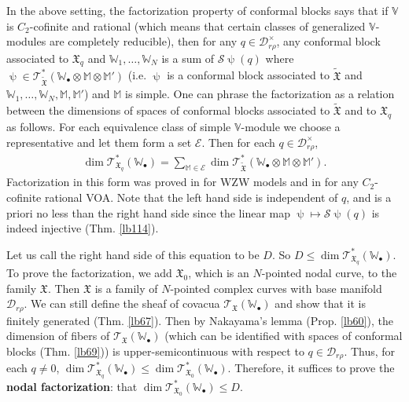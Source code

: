 \documentclass[12pt,b5paper,notitlepage]{report}
\theoremstyle{definition}
\theoremstyle{plain}
\newcommand{\fk}{\mathfrak}
\newcommand{\mc}{\mathcal}
\newcommand{\wtd}{\widetilde}
\newcommand{\scr}{\mathscr}
\newcommand{\blt}{\bullet}
\newcommand{\Vbb}{\mathbb V}
\newcommand{\Wbb}{\mathbb W}
\newcommand{\Mbb}{\mathbb M}
\numberwithin{equation}{section}
\begin{document}
In the above setting, the factorization property of conformal blocks says that if $\Vbb$ is $C_2$-cofinite and rational (which means that certain classes of generalized $\Vbb$-modules are completely reducible), then  for any $q\in\mc D_{r\rho}^\times$, any conformal block associated to $\fk X_q$ and $\Wbb_1,\dots,\Wbb_N$ is a sum of $\mc S\uppsi(q)$ where $\uppsi\in\scr T_{\wtd{\fk X}}^*(\Wbb_\blt\otimes\Mbb\otimes\Mbb')$ (i.e. $\uppsi$ is a conformal block associated to $\wtd{\fk X}$ and $\Wbb_1,\dots,\Wbb_N,\Mbb,\Mbb'$) and $\Mbb$ is simple.  One can phrase the factorization as a relation between the dimensions of spaces of conformal blocks associated to $\wtd{\fk X}$ and to $\fk X_q$ as follows. For each equivalence class of simple $\Vbb$-module we choose a representative and let them form a set $\mc E$. Then for each $q\in\mc D_{r\rho}^\times$,
\begin{align*}
\dim\scr T_{\fk X_q}^*(\Wbb_\blt)=\sum_{\Mbb\in\mc E}\dim \scr T_{\wtd{\fk X}}^*(\Wbb_\blt\otimes\Mbb\otimes\Mbb').
\end{align*}
Factorization in this form was proved in \cite{TUY89} for WZW models and in \cite{DGT19b} for any $C_2$-cofinite rational VOA. Note that the left hand side is independent of $q$, and is a priori no less than the right hand side since the linear map $\uppsi\mapsto\mc S\uppsi(q)$ is indeed injective (Thm. \ref{lb114}).


Let us call the right hand side of this equation to be $D$. So $D\leq \dim\scr T_{\fk X_q}^*(\Wbb_\blt)$. To prove the factorization, we add $\fk X_0$, which is an $N$-pointed nodal curve, to the family $\fk X$. Then $\fk X$ is a family of $N$-pointed complex curves with base manifold $\mc D_{r\rho}$. We can still define the sheaf of covacua $\scr T_{\fk X}(\Wbb_\blt)$ and show that it is finitely generated (Thm. \ref{lb67}). Then by Nakayama's lemma (Prop. \ref{lb60}), the dimension of fibers of $\scr T_{\fk X}(\Wbb_\blt)$ (which can be identified with spaces of conformal blocks (Thm. \ref{lb69})) is upper-semicontinuous with respect to $q\in \mc D_{r\rho}$. Thus, for each $q\neq 0$, $\dim\scr T_{\fk X_q}^*(\Wbb_\blt)\leq \dim\scr T_{\fk X_0}^*(\Wbb_\blt)$. Therefore, it suffices to prove the \textbf{nodal factorization}:  that $\dim\scr T_{\fk X_0}^*(\Wbb_\blt)\leq D$.
\end{document}
